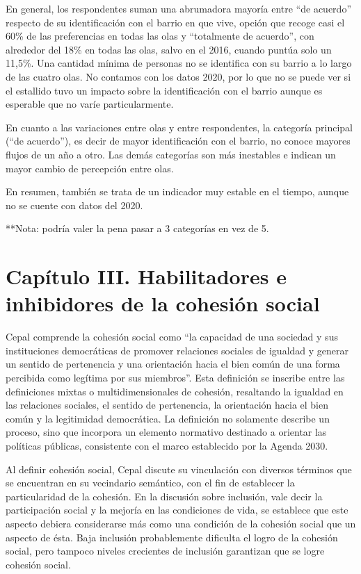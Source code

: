 \documentclass[
  12pt,
]{book}
\begin{document}
En general, los respondentes suman una abrumadora mayoría entre ``de acuerdo'' respecto de su identificación con el barrio en que vive, opción que recoge casi el 60\% de las preferencias en todas las olas y ``totalmente de acuerdo'', con alrededor del 18\% en todas las olas, salvo en el 2016, cuando puntúa solo un 11,5\%. Una cantidad mínima de personas no se identifica con su barrio a lo largo de las cuatro olas. No contamos con los datos 2020, por lo que no se puede ver si el estallido tuvo un impacto sobre la identificación con el barrio aunque es esperable que no varíe particularmente.

En cuanto a las variaciones entre olas y entre respondentes, la categoría principal (``de acuerdo''), es decir de mayor identificación con el barrio, no conoce mayores flujos de un año a otro. Las demás categorías son más inestables e indican un mayor cambio de percepción entre olas.

En resumen, también se trata de un indicador muy estable en el tiempo, aunque no se cuente con datos del 2020.

**Nota: podría valer la pena pasar a 3 categorías en vez de 5.

\hypertarget{capuxedtulo-iii.-habilitadores-e-inhibidores-de-la-cohesiuxf3n-social}{%
\chapter{Capítulo III. Habilitadores e inhibidores de la cohesión social}\label{capuxedtulo-iii.-habilitadores-e-inhibidores-de-la-cohesiuxf3n-social}}

Cepal comprende la cohesión social como ``la capacidad de una sociedad y sus instituciones democráticas de promover relaciones sociales de igualdad y generar un sentido de pertenencia y una orientación hacia el bien común de una forma percibida como legítima por sus miembros''. Esta definición se inscribe entre las definiciones mixtas o multidimensionales de cohesión, resaltando la igualdad en las relaciones sociales, el sentido de pertenencia, la orientación hacia el bien común y la legitimidad democrática. La definición no solamente describe un proceso, sino que incorpora un elemento normativo destinado a orientar las políticas públicas, consistente con el marco establecido por la Agenda 2030.

Al definir cohesión social, Cepal discute su vinculación con diversos términos que se encuentran en su vecindario semántico, con el fin de establecer la particularidad de la cohesión. En la discusión sobre inclusión, vale decir la participación social y la mejoría en las condiciones de vida, se establece que este aspecto debiera considerarse más como una condición de la cohesión social que un aspecto de ésta. Baja inclusión probablemente dificulta el logro de la cohesión social, pero tampoco niveles crecientes de inclusión garantizan que se logre cohesión social.
\end{document}
